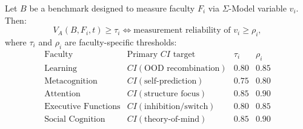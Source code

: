 \begin{theorem}
\label{thm:validity}
Let $B$ be a benchmark designed to measure faculty $F_i$ via
$\Sigma$-Model variable $v_i$. Then:
\[
V_A(B, F_i, t) \geq \tau_i \iff
\text{measurement reliability of } v_i \geq \rho_i,
\]
where $\tau_i$ and $\rho_i$ are faculty-specific thresholds:
\[
\begin{array}{lccc}
\text{Faculty} & \text{Primary } CI \text{ target} & \tau_i & \rho_i \\
\hline
\text{Learning} & CI(\text{OOD recombination}) & 0.80 & 0.85 \\
\text{Metacognition} & CI(\text{self-prediction}) & 0.75 & 0.80 \\
\text{Attention} & CI(\text{structure focus}) & 0.85 & 0.90 \\
\text{Executive Functions} & CI(\text{inhibition/switch}) & 0.80 & 0.85 \\
\text{Social Cognition} & CI(\text{theory-of-mind}) & 0.85 & 0.90
\end{array}
\]
\end{theorem}

